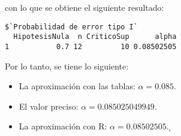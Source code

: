 \begin{solucion}
\begin{enumerate}
  \vspace{-0.5cm}
  con lo que se obtiene el siguiente resultado:
  \begin{verbatim}
$`Probabilidad de error tipo I`
  HipotesisNula  n CriticoSup      alpha
1           0.7 12         10 0.08502505
  \end{verbatim}
  \vspace{-0.5cm}
  Por lo tanto, se tiene lo siguiente:
  \begin{itemize}
   \item La aproximaci\'on con las tablas: $\alpha = 0.085$.
   \item El valor preciso: $\alpha = 0.085025049949$.
   \item La aproximaci\'on con R: $\alpha = 0.08502505$.${}_{\square}$
  \end{itemize}


\end{enumerate}
\end{solucion}
